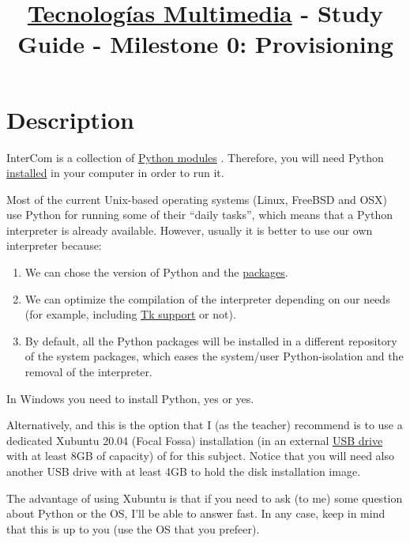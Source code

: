 \title{\href{https://www.ual.es/estudios/grados/presentacion/plandeestudios/asignatura/4015/40154321?idioma=zh_CN}{Tecnologías Multimedia} - Study Guide - Milestone 0: Provisioning}

\maketitle

\section{Description}

InterCom \cite{intercom} is a collection of
\href{https://docs.python.org/3/tutorial/modules.html#}{Python
  modules} \cite{python}. Therefore, you will need Python
\href{https://www.python.org/downloads/}{installed} in your computer
in order to run it.

Most of the current Unix-based operating systems (Linux, FreeBSD and
OSX) use Python for running some of their ``daily tasks'', which means
that a Python interpreter is already available. However, usually it is
better to use our own interpreter because:
\begin{enumerate}
\item We can chose the version of Python and the
  \href{https://docs.python.org/3/tutorial/modules.html#packages}{packages}.
\item We can optimize the compilation of the interpreter depending on
  our needs (for example, including
  \href{https://wiki.python.org/moin/TkInter}{Tk support} or not).
\item By default, all the Python packages will be installed in a
  different repository of the system packages, which eases the
  system/user Python-isolation and the removal of the interpreter.
\end{enumerate}
In Windows you need to install Python, yes or yes.

Alternatively, and this is the option that I (as the teacher)
recommend is to use a dedicated Xubuntu 20.04 (Focal Fossa)
\cite{xubuntu} installation (in an external
\href{https://en.wikipedia.org/wiki/USB_flash_drive}{USB drive} with
at least 8GB of capacity) of for this subject. Notice that you will
need also another USB drive with at least 4GB to hold the disk
installation image.

The advantage of using Xubuntu is that if you need to ask (to
me) some question about Python or the OS, I'll be able to answer
fast. In any case, keep in mind that this is up to you (use the OS
that you prefeer).

